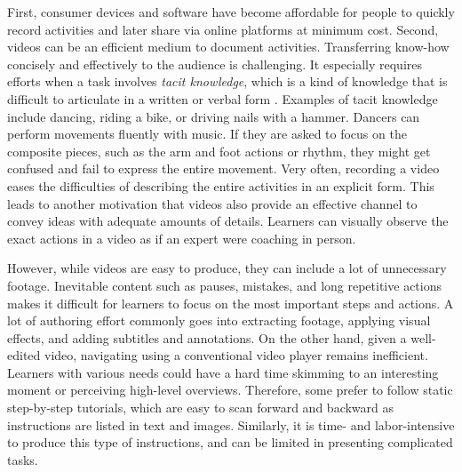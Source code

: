 First, consumer devices and software have become affordable for people to quickly record activities and later share via online platforms at minimum cost.
%
Second, videos can be an efficient medium to document activities. Transferring know-how concisely and effectively to the audience is challenging. It especially requires efforts when a task involves \emph{tacit knowledge}, which is a kind of knowledge that is difficult to articulate in a written or verbal form \cite{polanyi1958personal, Klemmer:2006:BMF:1142405.1142429}. Examples of tacit knowledge include dancing, riding a bike, or driving nails with a hammer. Dancers can perform movements fluently with music. If they are asked to focus on the composite pieces, such as the arm and foot actions or rhythm, they might get confused and fail to express the entire movement. Very often, recording a video eases the difficulties of describing the entire activities in an explicit form.
%
This leads to another motivation that videos also provide an effective channel to convey ideas with adequate amounts of details. Learners can visually observe the exact actions in a video as if an expert were coaching in person.

However, while videos are easy to produce, they can include a lot of unnecessary footage. Inevitable content such as pauses, mistakes, and long repetitive actions makes it difficult for learners to focus on the most important steps and actions. A lot of authoring effort commonly goes into extracting footage, applying visual effects, and adding subtitles and annotations. On the other hand, given a well-edited video, navigating using a conventional video player remains inefficient. Learners with various needs could have a hard time skimming to an interesting moment or perceiving high-level overviews. Therefore, some prefer to follow static step-by-step tutorials, which are easy to scan forward and backward as instructions are listed in text and images. Similarly, it is time- and labor-intensive to produce this type of instructions, and can be limited in presenting complicated tasks.


